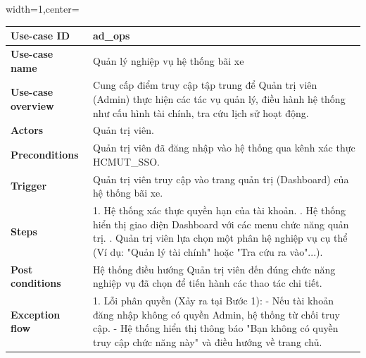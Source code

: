 \begin{adjustbox}{width=1\textwidth,center=\textwidth}
\small
\begin{tabular}{|>{\centering\arraybackslash}m{3.5cm}|m{13.2cm}|}
\hline
\textbf{Use-case ID} & ad\_ops \\ \hline
\textbf{Use-case name} & Quản lý nghiệp vụ hệ thống bãi xe \\ \hline
\textbf{Use-case overview} & Cung cấp điểm truy cập tập trung để Quản trị viên (Admin) thực hiện các tác vụ quản lý, điều hành hệ thống như cấu hình tài chính, tra cứu lịch sử hoạt động. \\ \hline
\textbf{Actors} & Quản trị viên. \\ \hline
\textbf{Preconditions} & Quản trị viên đã đăng nhập vào hệ thống qua kênh xác thực HCMUT\_SSO. \\ \hline
\textbf{Trigger} & Quản trị viên truy cập vào trang quản trị (Dashboard) của hệ thống bãi xe. \\ \hline
\textbf{Steps} & 
1. Hệ thống xác thực quyền hạn của tài khoản. \newline
2. Hệ thống hiển thị giao diện Dashboard với các menu chức năng quản trị. \newline
3. Quản trị viên lựa chọn một phân hệ nghiệp vụ cụ thể (Ví dụ: "Quản lý tài chính" hoặc "Tra cứu ra vào"...). \\ \hline
\textbf{Post conditions} & Hệ thống điều hướng Quản trị viên đến đúng chức năng nghiệp vụ đã chọn để tiến hành các thao tác chi tiết. \\ \hline
\textbf{Exception flow} & 
1. Lỗi phân quyền (Xảy ra tại Bước 1): \newline
- Nếu tài khoản đăng nhập không có quyền Admin, hệ thống từ chối truy cập. \newline
- Hệ thống hiển thị thông báo "Bạn không có quyền truy cập chức năng này" và điều hướng về trang chủ. \\ \hline
\end{tabular}
\end{adjustbox}


